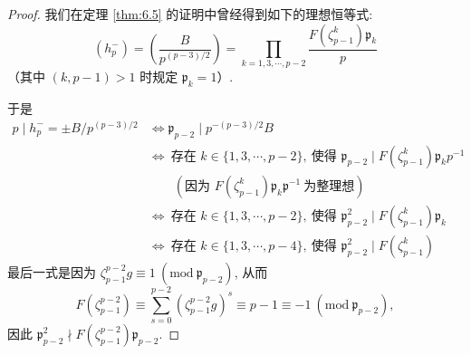 \begin{proof}
我们在定理 \ref{thm:6.5} 的证明中曾经得到如下的理想恒等式:
\[
  (h_p^-)=\left(\frac{B}{p^{(p-3)/2}}\right)=\prod_{k=1,3,\cdots,p-2}\frac{F(\zeta_{p-1}^k)\mathfrak{p}_k}{p}
\]
（其中 $(k,p-1)>1$ 时规定 $\mathfrak{p}_k=1$）.

于是
\begin{align*}
  p\mid h_p^-=\pm B/p^{(p-3)/2}&\Leftrightarrow\mathfrak{p}_{p-2}\mid p^{-(p-3)/2}B\\
  &\Leftrightarrow\ \text{存在 } k\in\{1,3,\cdots,p-2\},\ \text{使得 } \mathfrak{p}_{p-2}\mid F(\zeta_{p-1}^k)\mathfrak{p}_kp^{-1}\\
  &\qquad(\text{因为 } F(\zeta_{p-1}^k)\mathfrak{p}_k\mathfrak{p}^{-1}\ \text{为整理想})\\
  &\Leftrightarrow\ \text{存在 } k\in\{1,3,\cdots,p-2\},\ \text{使得 } \mathfrak{p}_{p-2}^2\mid F(\zeta_{p-1}^k)\mathfrak{p}_k\\
  &\Leftrightarrow\ \text{存在 } k\in\{1,3,\cdots,p-4\},\ \text{使得 } \mathfrak{p}_{p-2}^2\mid F(\zeta_{p-1}^k)\tag{1}
\end{align*}
最后一式是因为 $\zeta_{p-1}^{p-2}g\equiv 1\ (\mathrm{mod}\ \mathfrak{p}_{p-2})$, 从而
\[
  F(\zeta_{p-1}^{p-2})\equiv\sum_{s=0}^{p-2}(\zeta_{p-1}^{p-2}g)^s\equiv p-1\equiv -1\ (\mathrm{mod}\ \mathfrak{p}_{p-2}),
\]
因此 $\mathfrak{p}_{p-2}^2\nmid F(\zeta_{p-1}^{p-2})\mathfrak{p}_{p-2}$.


\end{proof}
